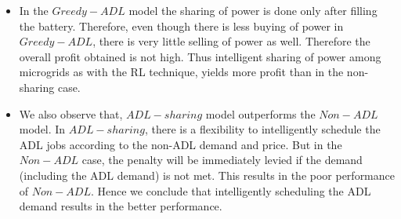 \begin{itemize}

\item In the $Greedy-ADL$ model the sharing of power is done only after filling the battery. Therefore, even though there is less buying of power in $Greedy-ADL$, there is very little selling of power as well. Therefore the overall profit obtained is not high. Thus intelligent sharing of power among microgrids as with the RL technique, yields more profit than in the non-sharing case. 

\item We also observe that, $ADL-sharing$ model outperforms the $Non-ADL$ model. In $ADL-sharing$, there is a flexibility to intelligently schedule the ADL jobs according to the non-ADL demand and price. But in the $Non-ADL$ case, the penalty will be immediately levied if the demand (including the ADL demand) is not met. This results in the poor performance of $Non-ADL$. Hence we conclude that intelligently scheduling the ADL demand results in the better performance.



	

\end{itemize}
